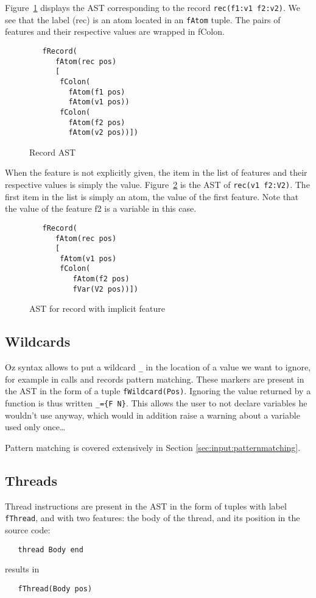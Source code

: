 \documentclass[a4paper]{memoir}
\begin{document}
Figure~\ref{fig:recordsast} displays the AST corresponding to the record \lstinline!rec(f1:v1 f2:v2)!. We see that the label (rec) is an atom located in an \lstinline!fAtom! tuple. The pairs of features and their respective values are wrapped in fColon.

\begin{figure}[h]
\begin{lstlisting}
   fRecord(
      fAtom(rec pos)
      [
       fColon(
         fAtom(f1 pos)
         fAtom(v1 pos))
       fColon(
         fAtom(f2 pos)
         fAtom(v2 pos))])
\end{lstlisting}
\caption{Record AST}
\label{fig:recordsast}
\end{figure}


When the feature is not explicitly given, the item in the list of features and their respective values is simply the value. Figure~\ref{fig:astfeature} is the AST of \lstinline!rec(v1 f2:V2)!. The first item in the list is simply an atom, the value of the first feature. Note that the value of the feature f2 is a variable in this case.

\begin{figure}[h]
\begin{lstlisting}
   fRecord(
      fAtom(rec pos)
      [
       fAtom(v1 pos)
       fColon(
          fAtom(f2 pos)
          fVar(V2 pos))])
\end{lstlisting}
\caption{AST for record with implicit feature}
\label{fig:astfeature}
\end{figure}



\subsection{Wildcards}\label{sec:input:wildcard}
Oz syntax allows to put a wildcard \lstinline!_! in the location of a value we want to ignore, for example in calls and records pattern matching. These markers are present in the AST in the form of a tuple \lstinline!fWildcard(Pos)!.
Ignoring the value returned by a function is thus written \lstinline!_={F N}!. 
This allows the user to not declare variables he wouldn't use anyway, which would in addition raise a warning about a variable used only once\ldots

Pattern matching is covered extensively in Section \ref{sec:input:patternmatching}.

\subsection{Threads}
Thread instructions are present in the AST in the form of tuples with label \lstinline!fThread!, and with two features: the body of the thread, and its position in the source code:
\begin{lstlisting}
   thread Body end
\end{lstlisting}
results in
\begin{lstlisting}
   fThread(Body pos)
\end{lstlisting}
\end{document}
